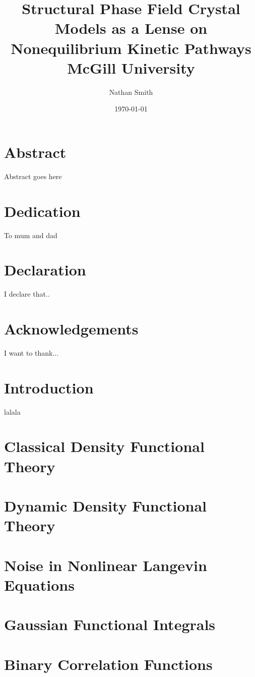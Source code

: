 \documentclass[11pt, letterpaper, twoside, openright]{book}
\title{
	{Structural Phase Field Crystal Models as a Lense on Nonequilibrium Kinetic Pathways}\\
	{\large McGill University}\\
}
\author{Nathan Smith}
\date{\today}
\begin{document}
\maketitle

\chapter*{Abstract}
Abstract goes here

\chapter*{Dedication}
To mum and dad

\chapter*{Declaration}
I declare that..

\chapter*{Acknowledgements}
I want to thank...

\tableofcontents

\chapter{Introduction}
lalala

\chapter{Classical Density Functional Theory}
\begin{refsection}

\printbibliography
\end{refsection}

\chapter{Dynamic Density Functional Theory}


\appendix

\chapter{Noise in Nonlinear Langevin Equations}
\begin{refsection}

\printbibliography
\end{refsection}

\chapter{Gaussian Functional Integrals}
\begin{refsection}

\printbibliography
\end{refsection}

\chapter{Binary Correlation Functions}
\begin{refsection}

\printbibliography
\end{refsection}
\end{document}
